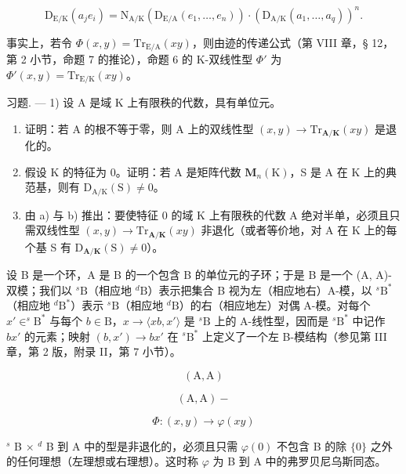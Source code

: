 \[
\mathrm{D} _ {\mathrm{E} / \mathrm{K}} (a _ {j} e _ {i}) = \mathrm{N} _ {\mathrm{A} / \mathrm{K}} (\mathrm{D} _ {\mathrm{E} / \mathrm{A}} (e _ {1}, \dots , e _ {n})) \cdot (\mathrm{D} _ {\mathrm{A} / \mathrm{K}} (a _ {1}, \dots , a _ {q})) ^ {n}.
\]

事实上，若令 \(\Phi(x,y)=\mathrm{Tr}_{\mathrm{E/A}}(xy)\)，则由迹的传递公式（第 VIII 章，§ 12，第 2 小节，命题 7 的推论），命题 6 的 K-双线性型 \(\Phi'\) 为 \(\Phi'(x,y)=\mathrm{Tr}_{\mathrm{E/K}}(xy)\)。

习题. — 1) 设 A 是域 K 上有限秩的代数，具有单位元。

\begin{enumerate}
\def\labelenumi{\alph{enumi})}
\item
  证明：若 A 的根不等于零，则 A 上的双线性型 \((x, y) \to \mathrm{Tr}_{\mathbf{A}/\mathbf{K}}(xy)\) 是退化的。
\item
  假设 K 的特征为 0。证明：若 A 是矩阵代数 \(\mathbf{M}_{n}(\mathrm{K})\)，S 是 A 在 K 上的典范基，则有 \(\mathrm{D}_{\mathrm{A}/\mathrm{K}}(\mathrm{S}) \neq 0\)。
\item
  由 a) 与 b) 推出：要使特征 0 的域 K 上有限秩的代数 A 绝对半单，必须且只需双线性型 \((x,y)\to\mathrm{Tr}_{\mathbf{A}/\mathbf{K}}(xy)\) 非退化（或者等价地，对 A 在 K 上的每个基 S 有 \(\mathrm{D}_{\mathbf{A}/\mathbf{K}}(\mathrm{S})\neq0\)）。
\end{enumerate}

设 B 是一个环，A 是 B 的一个包含 B 的单位元的子环；于是 B 是一个 (A, A)-双模；我们以 \(^s\text{B}\)（相应地 \(^d\text{B}\)）表示把集合 B 视为左（相应地右）A-模，以 \(^s\text{B}^*\)（相应地 \(^d\text{B}^*\)）表示 \(^s\text{B}\)（相应地 \(^d\text{B}\)）的右（相应地左）对偶 A-模。对每个 \(x' \in ^s\text{B}^*\) 与每个 \(b \in \text{B}\)，\(x \to \langle xb, x' \rangle\) 是 \(^s\text{B}\) 上的 A-线性型，因而是 \(^s\text{B}^*\) 中记作 \(bx'\) 的元素；映射 \((b, x') \to bx'\) 在 \(^s\text{B}^*\) 上定义了一个左 B-模结构（参见第 III 章，第 2 版，附录 II，第 7 小节）。

\[
(\mathrm{A}, \mathrm{A})
\]

\[
(\mathrm{A}, \mathrm{A}) -
\]

\[
\Phi : (x, y) \rightarrow \varphi (x y)
\]

\(^{s}\) B × \(^{d}\) B 到 A 中的型是非退化的，必须且只需 \(\varphi(0)\) 不包含 B 的除 \(\{0\}\) 之外的任何理想（左理想或右理想）。这时称 \(\varphi\) 为 B 到 A 中的弗罗贝尼乌斯同态。

